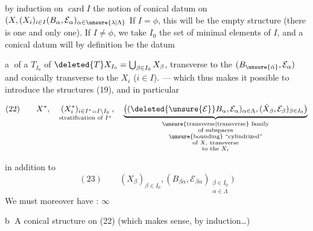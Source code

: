 by induction on $\operatorname{card}I$ the notion of
conical datum  on 
$(X,(X_i)_{i\in I}(B_\alpha,\mathcal E_\alpha)_{\alpha\in\unsure{\lambda|\Lambda}}$
 If $I=\phi$, this will be the empty
structure (there is one and only one). If
$I\ne\phi$, we take $I_0$ the set of minimal elements
of $I$, and a conical datum will by
definition be the datum

\textcircled{a} of a  $T_{I_0}$
of  $\deleted{T}X_{I_0}=\bigcup_{\beta\in I_0}X_\beta$,
transverse to the $(B_{\unsure{\bar\alpha}},\mathcal E_\alpha)$ and
conically transverse to the $X_i$ ($i\in I$).
--- which thus makes it possible to introduce the
structures (19), and in particular

\[
(22)\qquad
X^*,\quad
\underset{\text{stratification of }I^*}{(X_i^*)_{i\in I^*=I\setminus I_0}},
\quad
\underbrace{\big((\deleted{\unsure{\mathcal E}}B_\alpha,\mathcal E_\alpha)_{\alpha\in\Lambda},
(\dot X_\beta,\mathcal E_\beta)_{\beta\in I_0}\big)}
_{\substack{\text{\unsure{transverse|transverse} family}\\\text{of subspaces}\\
\text{\unsure{bounding} ``cylindrized''}\\
\text{of }X,\ \text{transverse}\\\text{to the }X_i}}
\]

in addition to
\[
(23)\qquad
(X_\beta)_{\beta\in I_0},
(B_{\beta\alpha},\mathcal E_{\beta\alpha})_{\substack{\beta\in I_0\\\alpha\in\Lambda}}\big)
\]
We must moreover have : $\infty$

\textcircled{b} A conical structure on (22) (which
makes sense, by induction\ldots)
